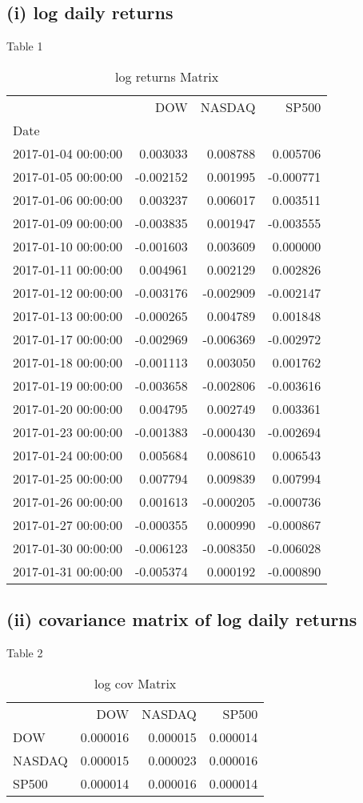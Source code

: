 \documentclass{article}
\begin{document}
\subsection*{(i) log daily returns}{Table 1}
\begin{table}
\caption{log returns Matrix}
\label{tab:log_returns}
\begin{tabular}{lrrr}
 & DOW & NASDAQ & SP500 \\
Date &  &  &  \\
2017-01-04 00:00:00 & 0.003033 & 0.008788 & 0.005706 \\
2017-01-05 00:00:00 & -0.002152 & 0.001995 & -0.000771 \\
2017-01-06 00:00:00 & 0.003237 & 0.006017 & 0.003511 \\
2017-01-09 00:00:00 & -0.003835 & 0.001947 & -0.003555 \\
2017-01-10 00:00:00 & -0.001603 & 0.003609 & 0.000000 \\
2017-01-11 00:00:00 & 0.004961 & 0.002129 & 0.002826 \\
2017-01-12 00:00:00 & -0.003176 & -0.002909 & -0.002147 \\
2017-01-13 00:00:00 & -0.000265 & 0.004789 & 0.001848 \\
2017-01-17 00:00:00 & -0.002969 & -0.006369 & -0.002972 \\
2017-01-18 00:00:00 & -0.001113 & 0.003050 & 0.001762 \\
2017-01-19 00:00:00 & -0.003658 & -0.002806 & -0.003616 \\
2017-01-20 00:00:00 & 0.004795 & 0.002749 & 0.003361 \\
2017-01-23 00:00:00 & -0.001383 & -0.000430 & -0.002694 \\
2017-01-24 00:00:00 & 0.005684 & 0.008610 & 0.006543 \\
2017-01-25 00:00:00 & 0.007794 & 0.009839 & 0.007994 \\
2017-01-26 00:00:00 & 0.001613 & -0.000205 & -0.000736 \\
2017-01-27 00:00:00 & -0.000355 & 0.000990 & -0.000867 \\
2017-01-30 00:00:00 & -0.006123 & -0.008350 & -0.006028 \\
2017-01-31 00:00:00 & -0.005374 & 0.000192 & -0.000890 \\
\end{tabular}
\end{table}

\subsection*{(ii) covariance matrix of log daily returns}{Table 2}
\begin{table}
\caption{log cov Matrix}
\label{tab:log_cov}
\begin{tabular}{lrrr}
 & DOW & NASDAQ & SP500 \\
DOW & 0.000016 & 0.000015 & 0.000014 \\
NASDAQ & 0.000015 & 0.000023 & 0.000016 \\
SP500 & 0.000014 & 0.000016 & 0.000014 \\
\end{tabular}
\end{table}
\end{document}
